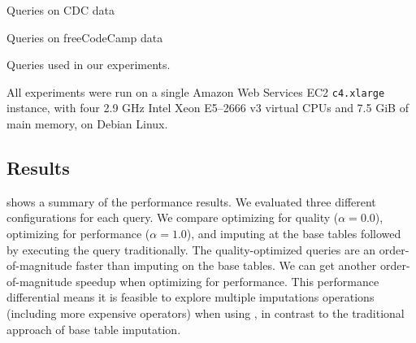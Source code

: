 \begin{table}
  \centering
  \begin{subtable}{\linewidth}
    
    \caption{Queries on CDC data}\label{fig:queries-cdc}
  \end{subtable}
  \par\medskip
  \begin{subtable}{\linewidth}
    
    \caption{Queries on freeCodeCamp data}\label{fig:queries-fcc}
  \end{subtable}
  \par\medskip
  \caption{Queries used in our experiments.}\label{fig:queries}
\end{table}

%  

All experiments were run on a single Amazon Web Services EC2 {\tt c4.xlarge} instance, with
four 2.9 GHz Intel Xeon E5--2666 v3 virtual CPUs and 7.5 GiB of main memory, on Debian Linux.

\subsection{Results}\label{sec:results}

 shows a summary of the performance results. We evaluated three different
configurations for each query. We compare \ProjectName{} optimizing for quality ($\alpha=0.0$),
\ProjectName{} optimizing for performance ($\alpha=1.0$), and imputing at the base tables followed
by executing the query traditionally. The quality-optimized queries are an order-of-magnitude
faster than imputing on the base tables. We can get another order-of-magnitude speedup when
optimizing for performance. This performance differential means it is feasible
to explore multiple imputations operations (including more expensive operators) when using
\ProjectName{}, in contrast to the traditional approach of base table imputation.

